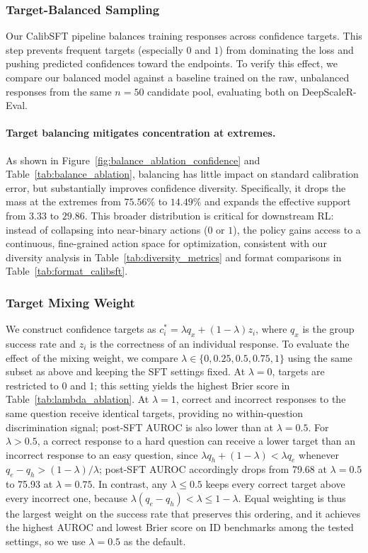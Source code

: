 \documentclass{article} %
\begin{document}
\subsubsection{Target-Balanced Sampling}

Our CalibSFT pipeline balances training responses across confidence targets. This step prevents frequent targets (especially $0$ and $1$) from dominating the loss and pushing predicted confidences toward the endpoints. To verify this effect, we compare our balanced model against a baseline trained on the raw, unbalanced responses from the same $n=50$ candidate pool, evaluating both on DeepScaleR-Eval.

\paragraph{Target balancing mitigates concentration at extremes.}
As shown in Figure~\ref{fig:balance_ablation_confidence} and Table~\ref{tab:balance_ablation}, balancing has little impact on standard calibration error, but substantially improves confidence diversity. Specifically, it drops the mass at the extremes from $75.56\%$ to $14.49\%$ and expands the effective support from $3.33$ to $29.86$. This broader distribution is critical for downstream RL: instead of collapsing into near-binary actions ($0$ or $1$), the policy gains access to a continuous, fine-grained action space for optimization, consistent with our diversity analysis in Table~\ref{tab:diversity_metrics} and format comparisons in Table~\ref{tab:format_calibsft}.







\subsubsection{Target Mixing Weight}
We construct confidence targets as
$c_i^*=\lambda q_x+(1-\lambda)z_i$, where $q_x$ is the group
success rate and $z_i$ is the correctness of an individual response.
To evaluate the effect of the mixing weight, we compare
$\lambda\in\{0,0.25,0.5,0.75,1\}$ using the same subset as above
and keeping the SFT settings fixed.
At $\lambda=0$, targets are restricted to 0 and 1; this setting yields
the highest Brier score in Table~\ref{tab:lambda_ablation}.
At $\lambda=1$, correct and incorrect responses to the same question
receive identical targets, providing no within-question discrimination
signal; post-SFT AUROC is also lower than at $\lambda=0.5$.
For $\lambda>0.5$, a correct response to a hard question can receive a lower target than an incorrect response to an easy question, since $\lambda q_h+(1-\lambda)<\lambda q_e$ whenever $q_e-q_h>(1-\lambda)/\lambda$; post-SFT AUROC accordingly drops from 79.68 at $\lambda=0.5$ to 75.93 at $\lambda=0.75$.
In contrast, any $\lambda\le 0.5$ keeps every correct target above every incorrect one, because $\lambda(q_e-q_h)<\lambda\le 1-\lambda$.
Equal weighting is thus the largest weight on the success rate that preserves this ordering, and it achieves the highest AUROC and lowest Brier score on ID benchmarks among the tested settings, so we use $\lambda=0.5$ as the default.
\end{document}

